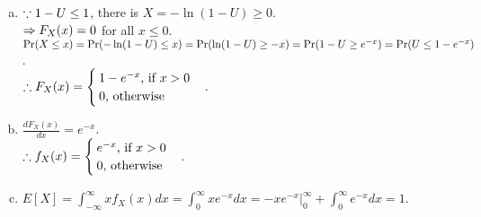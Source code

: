 \begin{pr}$ $
\begin{enumerate}[(a)]
\item $\cuz1-U\leq1$, there is $X=-\ln(1-U)\geq0$.\\
$\then F_X(x)=0$ for all $x\leq0$.\\
$\P(X\leq x)=\P(-\ln(1-U)\leq x)=\P(\ln(1-U)\geq-x)=\P(1-U\geq e^{-x})=\P(U\leq1-e^{-x})$.\\
$\so F_X(x)=\begin{cases}
1-e^{-x}\text{, if }x>0\\
0\text{, otherwise}
\end{cases}$.
\item $\frac{dF_X(x)}{dx}=e^{-x}$.\\
$\so f_X(x)=\begin{cases}
e^{-x}\text{, if }x>0\\
0\text{, otherwise}
\end{cases}$.
\item $E[X]=\int_{-\infty}^\infty xf_X(x)dx=\int_0^\infty xe^{-x}dx=-xe^{-x}|_0^\infty+\int_0^\infty e^{-x}dx=1$.
\end{enumerate}
\end{pr}
